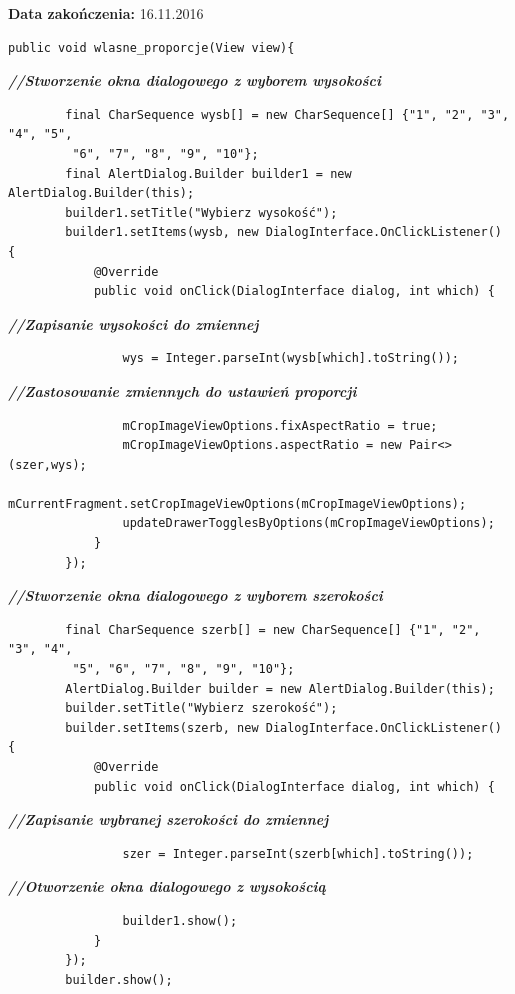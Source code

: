 \noindent\textbf{Data zakończenia:} 16.11.2016

\begin{verbatim}
public void wlasne_proporcje(View view){\end{verbatim}
              \textit{\textbf{//Stworzenie okna dialogowego z wyborem wysokości}}
                \begin{verbatim}
        final CharSequence wysb[] = new CharSequence[] {"1", "2", "3", "4", "5",
         "6", "7", "8", "9", "10"};
        final AlertDialog.Builder builder1 = new AlertDialog.Builder(this);
        builder1.setTitle("Wybierz wysokość");
        builder1.setItems(wysb, new DialogInterface.OnClickListener() {
            @Override
            public void onClick(DialogInterface dialog, int which) {\end{verbatim}
                          \textit{\textbf{//Zapisanie wysokości do zmiennej}}
                            \begin{verbatim}
                wys = Integer.parseInt(wysb[which].toString());\end{verbatim}
                              \textit{\textbf{//Zastosowanie zmiennych do ustawień proporcji}}
                                \begin{verbatim}
                mCropImageViewOptions.fixAspectRatio = true;
                mCropImageViewOptions.aspectRatio = new Pair<>(szer,wys);
                mCurrentFragment.setCropImageViewOptions(mCropImageViewOptions);
                updateDrawerTogglesByOptions(mCropImageViewOptions);
            }
        });\end{verbatim}
                      \textit{\textbf{//Stworzenie okna dialogowego z wyborem szerokości}}
                        \begin{verbatim}
        final CharSequence szerb[] = new CharSequence[] {"1", "2", "3", "4",
         "5", "6", "7", "8", "9", "10"};
        AlertDialog.Builder builder = new AlertDialog.Builder(this);
        builder.setTitle("Wybierz szerokość");
        builder.setItems(szerb, new DialogInterface.OnClickListener() {
            @Override
            public void onClick(DialogInterface dialog, int which) {\end{verbatim}
                          \textit{\textbf{//Zapisanie wybranej szerokości do zmiennej}}
                            \begin{verbatim}
                szer = Integer.parseInt(szerb[which].toString());\end{verbatim}
                              \textit{\textbf{//Otworzenie okna dialogowego z wysokością}}
                                \begin{verbatim}
                builder1.show();
            }
        });
        builder.show();
\end{verbatim}

